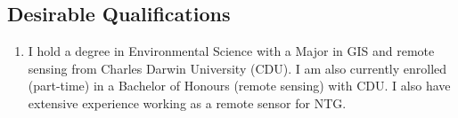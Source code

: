 \documentclass[a4paper,11pt]{article}
\begin{document}
 
\subsection{Desirable Qualifications}
\begin{enumerate}
\item I hold a degree in Environmental Science with a Major in GIS and remote sensing from Charles Darwin University (CDU). I am also currently enrolled (part-time) in a Bachelor of Honours (remote sensing) with CDU. I also have extensive experience working as a remote sensor for NTG.

\end{enumerate}

  

\vfill
{}

  
\end{document}
